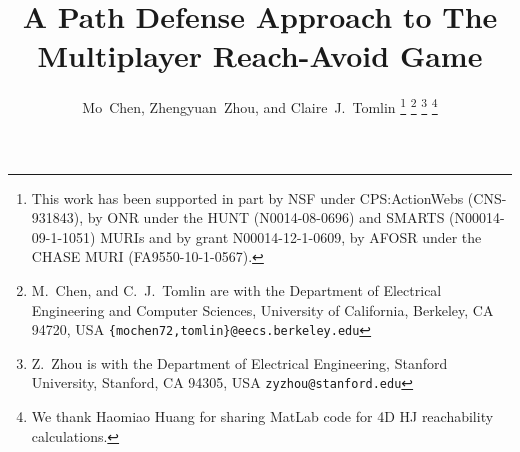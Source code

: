 \documentclass[letterpaper, 10 pt, conference]{ieeeconf}  %
\title{\LARGE \bf
A Path Defense Approach to The Multiplayer Reach-Avoid Game
}
\author{Mo~Chen, Zhengyuan~Zhou, and Claire~J.~Tomlin%
\thanks{This work has been supported in part by NSF under CPS:ActionWebs (CNS-931843), by ONR under the HUNT (N0014-08-0696) and SMARTS (N00014-09-1-1051) MURIs and by grant N00014-12-1-0609, by AFOSR under the CHASE MURI (FA9550-10-1-0567).}%
\thanks{M.~Chen, and C.~J.~Tomlin are with the Department of Electrical Engineering and Computer Sciences,
        University of California, Berkeley, CA 94720, USA
        {\tt\small \{mochen72,tomlin\}@eecs.berkeley.edu}}
\thanks{Z.~Zhou is with the Department of Electrical Engineering,
        Stanford University, Stanford, CA 94305, USA
        {\tt\small zyzhou@stanford.edu}}   
\thanks{We thank Haomiao Huang for sharing MatLab code for 4D HJ reachability calculations.}
}
\numberwithin{algorithm}{section}
\begin{document}
\maketitle

\thispagestyle{empty}
\pagestyle{empty}

\begin{abstract}

\end{abstract}







%





\end{document}
